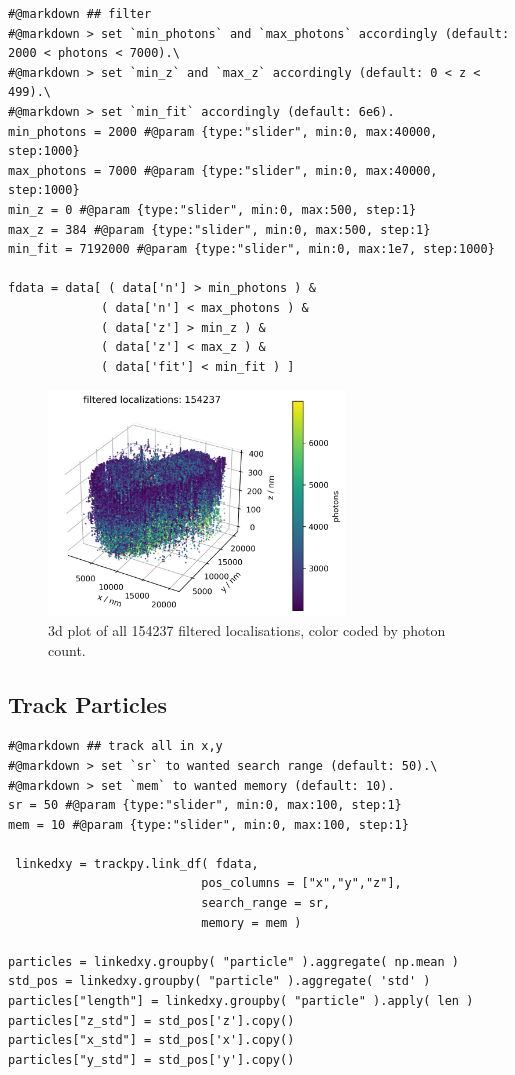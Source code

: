 \documentclass[11pt, a4paper, oneside, twocolumn]{report}
\begin{document}
\begin{verbatim}
#@markdown ## filter
#@markdown > set `min_photons` and `max_photons` accordingly (default: 2000 < photons < 7000).\
#@markdown > set `min_z` and `max_z` accordingly (default: 0 < z < 499).\
#@markdown > set `min_fit` accordingly (default: 6e6).
min_photons = 2000 #@param {type:"slider", min:0, max:40000, step:1000}
max_photons = 7000 #@param {type:"slider", min:0, max:40000, step:1000}
min_z = 0 #@param {type:"slider", min:0, max:500, step:1}
max_z = 384 #@param {type:"slider", min:0, max:500, step:1}
min_fit = 7192000 #@param {type:"slider", min:0, max:1e7, step:1000}
 
fdata = data[ ( data['n'] > min_photons ) &
             ( data['n'] < max_photons ) & 
             ( data['z'] > min_z ) &
             ( data['z'] < max_z ) &
             ( data['fit'] < min_fit ) ]
\end{verbatim}
           
\begin{figure}[h!]
  \centering
  \includegraphics[width=0.7\textwidth]{4_filter.png}
  \caption{3d plot of all 154237 filtered localisations, color coded
    by photon count.}
  \label{f:4_filter}
\end{figure}


\subsection{Track Particles}

\begin{verbatim}
#@markdown ## track all in x,y
#@markdown > set `sr` to wanted search range (default: 50).\
#@markdown > set `mem` to wanted memory (default: 10).
sr = 50 #@param {type:"slider", min:0, max:100, step:1}
mem = 10 #@param {type:"slider", min:0, max:100, step:1}
 
 linkedxy = trackpy.link_df( fdata,
                           pos_columns = ["x","y","z"],
                           search_range = sr,
                           memory = mem )
                           
particles = linkedxy.groupby( "particle" ).aggregate( np.mean )
std_pos = linkedxy.groupby( "particle" ).aggregate( 'std' )
particles["length"] = linkedxy.groupby( "particle" ).apply( len )
particles["z_std"] = std_pos['z'].copy()
particles["x_std"] = std_pos['x'].copy()
particles["y_std"] = std_pos['y'].copy()
\end{verbatim}
           
\end{document}
